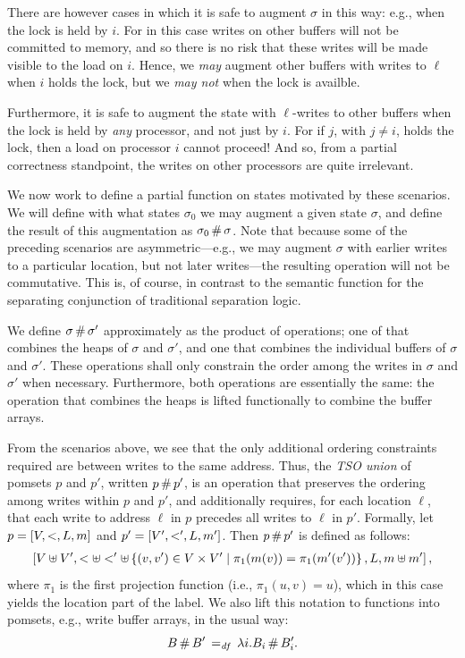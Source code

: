 \documentclass[11pt]{article}
\begin{document}
\begin{enumerate}
	There are however cases in which it is safe to augment $\sigma$ in this way: e.g., when the lock is held by $i$. For in this case writes on other buffers will not be committed to memory, and so there is no risk that these writes will be made visible to the load on $i$. Hence, we \emph{may} augment other buffers with writes to $\ell$ when $i$ holds the lock, but we \emph{may not} when the lock is availble. 

	Furthermore, it is safe to augment the state with $\ell$-writes to other buffers when the lock is held by \emph{any} processor, and not just by $i$. For if $j$, with $j \neq i$, holds the lock, then a load on processor $i$ cannot proceed! And so, from a partial correctness standpoint, the writes on other processors are quite irrelevant.
\end{enumerate}

We now work to define a partial function on states motivated by these scenarios. We will define with what states $\sigma_0$ we may augment a given state $\sigma$, and define the result of this augmentation as $\sigma_0 \operatorname{\#} \sigma$. Note that because some of the preceding scenarios are asymmetric---e.g., we may augment $\sigma$ with earlier writes to a particular location, but not later writes---the resulting operation will not be commutative. This is, of course, in contrast to the semantic function for the separating conjunction of traditional separation logic. 

We define $\sigma \operatorname{\#} \sigma'$ approximately as the product of operations; one of that combines the heaps of $\sigma$ and $\sigma'$, and one that combines the individual buffers of $\sigma$ and $\sigma'$. These operations shall only constrain the order among the writes in $\sigma$ and $\sigma'$ when necessary.  Furthermore, both operations are essentially the same: the operation that combines the heaps is lifted functionally to combine the buffer arrays.

From the scenarios above, we see that the only additional ordering constraints required are between writes to the same address. Thus, the \emph{TSO union} of pomsets $p$ and $p'$, written $p \operatorname{\#} p'$, is an operation that preserves the ordering among writes within $p$ and $p'$, and additionally requires, for each location $\ell$, that each write to address $\ell$ in $p$ precedes all writes to $\ell$ in $p'$. Formally, let $p = \left[ V,<,L,m \right]$ and $p' = \left[ V',<',L,m' \right]$. Then $p \operatorname{\#} p'$ is defined as follows: \begin{align*}
	\left[ V \uplus V', < \uplus <' \uplus \left\lbrace (v,v') \in V \times V' \mid \pi_1(m(v)) = \pi_1(m'(v')) \right\rbrace, L, m \uplus m' \right],
\end{align*} where $\pi_1$ is the first projection function (i.e., $\pi_1(u,v) = u$), which in this case yields the location part of the label. We also lift this notation to functions into pomsets, e.g., write buffer arrays, in the usual way: \[ B \operatorname{\#} B' \operatorname{\;=_{\mathit{df}}\;} \lambda i . B_i \operatorname{\#} B'_i.\]
\end{document}
